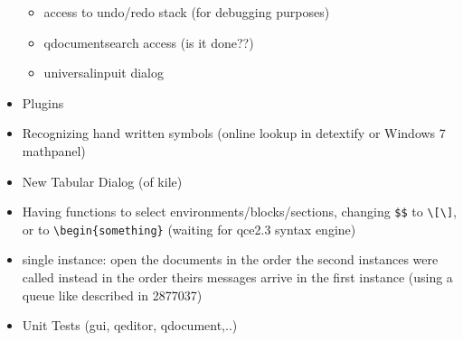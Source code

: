 \documentclass[10pt,a4paper,landscape]{report}
\begin{document}
\begin{itemize}
	\begin{itemize}
	\item access to undo/redo stack (for debugging purposes)
	\item qdocumentsearch access (is it done??)
	\item universalinpuit dialog
	\end{itemize}
	\item Plugins
	\item Recognizing hand written symbols (online lookup in detextify or Windows 7 mathpanel)
	\item New Tabular Dialog (of kile)
	\item Having functions to select environments/blocks/sections, changing \verb+$$+ to \verb+\[\]+, or to \verb+\begin{something}+ (waiting for qce2.3 syntax engine)
	\item single instance: open the documents in the order the second instances were called instead in the order theirs messages arrive in the first instance (using a queue like described in 2877037)
	\item Unit Tests (gui, qeditor, qdocument,..)
\end{itemize}
\end{document}
